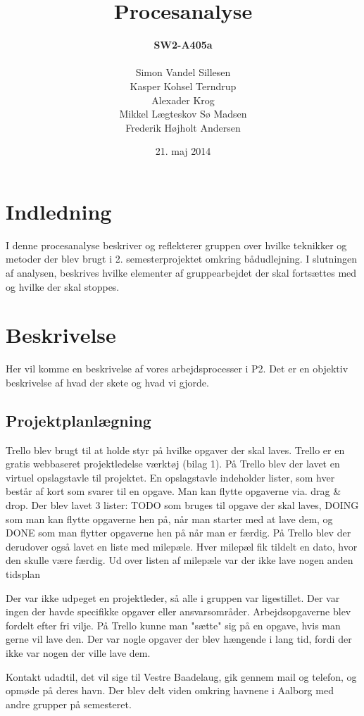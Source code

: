 \documentclass[a4paper,12pt,oneside]{article}
\title{Procesanalyse}
\author{\textbf{SW2-A405a} \\ \\
Simon Vandel Sillesen\\
Kasper Kohsel Terndrup\\
Alexader Krog\\
Mikkel Lægteskov Sø Madsen\\
Frederik Højholt Andersen}
\date{21. maj 2014}
\begin{document}
\maketitle

\section{Indledning}

I denne procesanalyse beskriver og reflekterer gruppen over hvilke teknikker og metoder der blev brugt i 2. semesterprojektet omkring bådudlejning.  I slutningen af analysen, beskrives hvilke elementer af gruppearbejdet der skal fortsættes med og hvilke der skal stoppes.

\section{Beskrivelse}

Her vil komme en beskrivelse af vores arbejdsprocesser i P2. Det er en objektiv beskrivelse af hvad der skete og hvad vi gjorde.

\subsection{Projektplanlægning}

Trello blev brugt til at holde styr på hvilke opgaver der skal laves. Trello er en gratis webbaseret projektledelse værktøj (bilag 1). På Trello blev der lavet en virtuel opslagstavle til projektet. En opslagstavle indeholder lister, som hver består af kort som svarer til en opgave. Man kan flytte opgaverne via. drag \& drop. Der blev lavet 3 lister: TODO som bruges til opgave der skal laves, DOING som man kan flytte opgaverne hen på, når man starter med at lave dem, og DONE som man flytter opgaverne hen på når man er færdig. På Trello blev der derudover også lavet en liste med milepæle. Hver milepæl fik tildelt en dato, hvor den skulle være færdig. Ud over listen af milepæle var der ikke lave nogen anden tidsplan

Der var ikke udpeget en projektleder, så alle i gruppen var ligestillet. Der var ingen der havde specifikke opgaver eller ansvarsområder. Arbejdsopgaverne blev fordelt efter fri vilje. På Trello kunne man "sætte" sig på en opgave, hvis man gerne vil lave den. Der var nogle opgaver der blev hængende i lang tid, fordi der ikke var nogen der ville lave dem.

Kontakt udadtil, det vil sige til Vestre Baadelaug, gik gennem mail og telefon, og opmøde på deres havn. Der blev delt viden omkring havnene i Aalborg med andre grupper på semesteret.
\end{document}
